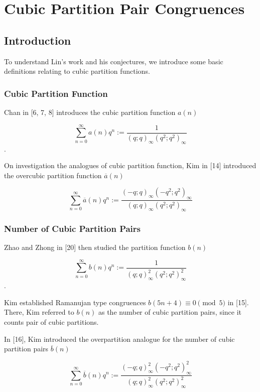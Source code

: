 \chapter{Cubic Partition Pair Congruences}

\section{Introduction}
To understand Lin's work and his conjectures, we introduce some basic definitions relating to cubic partition functions.
\subsection{Cubic Partition Function}

Chan in [6, 7, 8] introduces the cubic partition function $a(n)$

\begin{definition}
$$ \sum_{n=0}^{\infty} a(n)q^n := \frac{1}{(q;q)_\infty(q^2;q^2)_\infty} $$.
\end{definition}

On investigation the analogues of cubic partition function, Kim in [14] introduced the overcubic partition function $\overline{a}(n)$

\begin{definition}
$$ \sum_{n=0}^{\infty} \overline{a}(n)q^n := \frac{(-q;q)_\infty(-q^2;q^2)_\infty}{(q;q)_\infty(q^2;q^2)_\infty} $$
\end{definition}

\subsection{Number of Cubic Partition Pairs}
Zhao and Zhong  in [20] then studied the partition function $b(n)$

\begin{definition}
$$ \sum_{n=0}^{\infty} b(n)q^n := \frac{1}{(q;q)^2_\infty(q^2;q^2)^2_\infty} $$.
\end{definition}

Kim established Ramanujan type congruences $b(5n+4) \equiv 0 \pmod 5$ in [15]. There, Kim referred to $b(n)$ as the number of cubic partition pairs, since it counts pair of cubic partitions.

In [16], Kim introduced the overpartition analogue for the number of cubic partition pairs $\overline{b}(n)$

\begin{definition}
$$ \sum_{n=0}^{\infty} \overline{b}(n)q^n := \frac{(-q;q)_\infty^2(-q^2;q^2)_\infty^2}{(q;q)_\infty^2(q^2;q^2)_\infty^2} $$
\end{definition}

